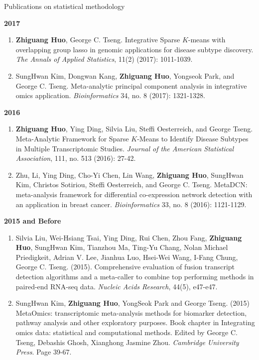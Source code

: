 \documentclass{resume} %
\begin{document}
\begin{rSection}{Publications on statistical methodology}
\begin{enumerate}[noitemsep,topsep=0pt, resume]
\end{enumerate}

\textbf{2017}
\begin{enumerate}[noitemsep,topsep=0pt, resume]

\item {\bf Zhiguang Huo}, George C. Tseng. 
    Integrative Sparse $K$-means with overlapping group lasso in genomic applications for disease subtype discovery.
    \emph{The Annals of Applied Statistics}, 11(2) (2017): 1011-1039.

\item 
SungHwan Kim, Dongwan Kang, {\bf Zhiguang Huo}, Yongseok Park, and George C. Tseng. 
Meta-analytic principal component analysis in integrative omics application. 
\emph{Bioinformatics} 34, no. 8 (2017): 1321-1328.

\end{enumerate}

\textbf{2016}
\begin{enumerate}[noitemsep,topsep=0pt,resume]

 \item  {\bf Zhiguang Huo}, Ying Ding, Silvia Liu, Steffi Oesterreich, and George Tseng. Meta-Analytic Framework for Sparse $K$-Means to Identify Disease Subtypes in Multiple Transcriptomic Studies. \emph{Journal of the American Statistical Association},  111, no. 513 (2016): 27-42.

\item 
Zhu, Li, Ying Ding, Cho-Yi Chen, Lin Wang,  {\bf Zhiguang Huo}, SungHwan Kim, Christos Sotiriou, Steffi Oesterreich, and George C. Tseng. MetaDCN: meta-analysis framework for differential co-expression network detection with an application in breast cancer. \emph{Bioinformatics} 33, no. 8 (2016): 1121-1129.
\end{enumerate}

\textbf{2015 and Before}
\begin{enumerate}[noitemsep,topsep=0pt,resume]
    \item Silvia Liu, Wei-Hsiang Tsai, Ying Ding, Rui Chen, Zhou Fang, {\bf Zhiguang Huo}, SungHwan Kim, Tianzhou Ma, Ting-Yu Chang, Nolan Michael Priedigkeit, Adrian V. Lee, Jianhua Luo, Hsei-Wei Wang, I-Fang Chung, George C. Tseng. (2015).
Comprehensive evaluation of fusion transcript detection algorithms and a meta-caller to combine top performing methods in paired-end RNA-seq data.
\emph{Nucleic Acids Research}, 44(5), e47-e47. 

\item SungHwan Kim,  {\bf Zhiguang Huo}, YongSeok Park and George Tseng.  (2015) MetaOmics: transcriptomic meta-analysis methods for biomarker detection, pathway analysis and other exploratory purposes. Book chapter in Integrating omics data: statistical and computational methods. Edited by George C. Tseng, Debashis Ghosh, Xianghong Jasmine Zhou. \emph{Cambridge University Press}. Page 39-67.


\end{enumerate}
\end{rSection}
\end{document}
